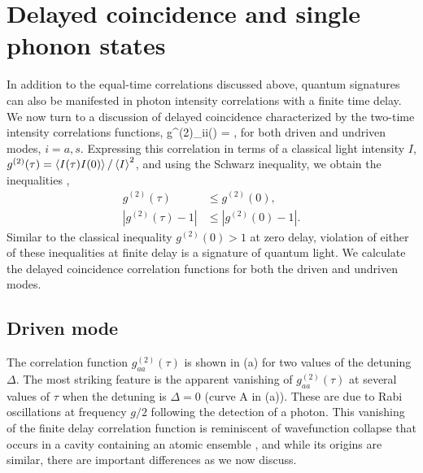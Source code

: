 \section{Delayed coincidence and single phonon states}
\label{sect:Delayed_coincidence}


In addition to the equal-time correlations discussed above,
quantum signatures can also be manifested in photon
intensity correlations with a finite time delay.
We now turn to a discussion of  delayed coincidence
characterized by the 
two-time
intensity correlations functions,
\bel
\label{eq:g2_tau}
	g^{(2)}_{ii}(\tau) = ,
\eel
for both driven and undriven modes, $i = a,s$.
Expressing this correlation in terms of a classical
light intensity $I$,
$g^{(2)}(\tau) = \left<  I(\tau) I(0)  \right> / \left<  I  \right>^2$,
and
using the Schwarz inequality, we
obtain the inequalities \cite{Carmichael1991, Brecha1999},
\begin{align}
  \label{eq:classical_criterium}
 	g^{(2)}(\tau) &\leq g^{(2)}(0),	%
	\\
	 |g^{(2)}(\tau)-1| & \leq |g^{(2)}(0)-1| .%
\end{align}
Similar to the classical inequality
$g^{(2)}(0) > 1$ at zero delay, 
violation of either of these inequalities
at finite delay is
a signature of quantum light. 
We calculate the delayed coincidence correlation
functions
for both the driven and undriven modes.


\subsection{Driven mode}
The
correlation function $g^{(2)}_{aa}(\tau)$ is shown in (a)
for two values of the detuning $\Delta$.
The most striking feature
is the apparent vanishing of  $g^{(2)}_{aa}(\tau)$
at several values of $\tau$ when the
detuning is $\Delta = 0$ (curve A in (a)).
These are due to Rabi oscillations at frequency
$g/2$ following the detection of a photon.
This vanishing of the finite delay correlation function
is reminiscent of  wavefunction collapse that
occurs in a cavity containing an 
atomic ensemble \cite{Carmichael1991},
and while its origins are similar, there are important
differences as we now discuss.




